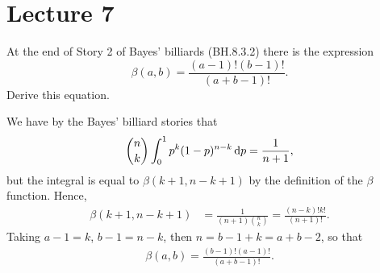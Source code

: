 \documentclass[lectures]{subfiles}
\begin{document}
\section{Lecture 7}
\label{sec:lecture-7}

\begin{exercise}
At the end of Story 2 of Bayes' billiards (BH.8.3.2) there is the expression
\begin{equation}
\label{eq:2}
\beta(a,b) = \frac{(a-1)!(b-1)!}{(a+b-1)!}.
\end{equation}
Derive this equation.
\begin{solution}
We have by the Bayes' billiard stories that
\begin{align}
  \label{}
{n \choose k} \int_0^1 p^k(1-p)^{n-k}\,\textrm{d}p = \frac{1}{n+1},
\end{align}
but the integral is equal to $\beta(k+1, n-k+1)$ by the definition of the $\beta$ function. Hence,
\begin{align*}
\beta(k+1, n-k+1)
&= \frac{1}{(n+1) {n \choose k}} = \frac{(n-k)!k!}{(n+1)!}.
\end{align*}
Taking $a-1 = k$, $b-1 =n -k$, then $n=b-1+k = a+b-2$, so that
\begin{align*}
\beta(a, b) = \frac{(b-1)!(a-1)!}{(a+b-1)!}.
\end{align*}
\end{solution}
\end{exercise}
\end{document}
